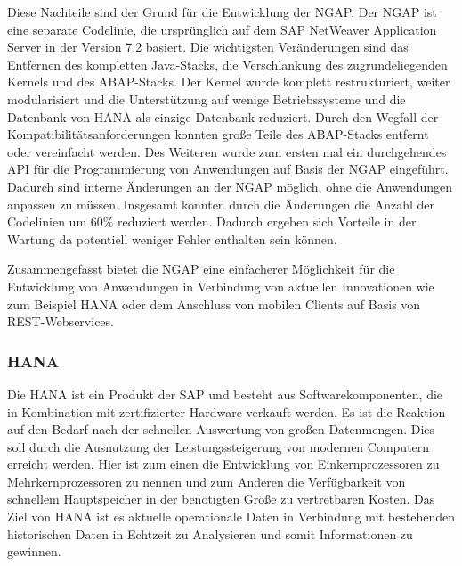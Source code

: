 Diese Nachteile sind der Grund für die Entwicklung der \gls{NGAP}. Der \gls{NGAP} ist eine separate Codelinie, die ursprünglich auf dem SAP NetWeaver Application Server in der Version 7.2 basiert. Die wichtigsten Veränderungen sind das Entfernen des kompletten Java-Stacks, die Verschlankung des zugrundeliegenden Kernels und des ABAP-Stacks. Der Kernel wurde komplett restrukturiert, weiter modularisiert und die Unterstützung auf wenige Betriebssysteme und die Datenbank von \gls{HANA} als einzige Datenbank reduziert. Durch den Wegfall der Kompatibilitätsanforderungen konnten große Teile des ABAP-Stacks entfernt oder vereinfacht werden. Des Weiteren wurde zum ersten mal ein durchgehendes API für die Programmierung von Anwendungen auf Basis der \gls{NGAP} eingeführt. Dadurch sind interne Änderungen an der \gls{NGAP} möglich, ohne die Anwendungen anpassen zu müssen. Insgesamt konnten durch die Änderungen die Anzahl der Codelinien um 60\% reduziert werden. Dadurch ergeben sich Vorteile in der Wartung da potentiell weniger Fehler enthalten sein können.

Zusammengefasst bietet die \gls{NGAP} eine einfacherer Möglichkeit für die Entwicklung von Anwendungen in Verbindung von aktuellen Innovationen wie zum Beispiel \gls{HANA} oder dem Anschluss von mobilen Clients auf Basis von REST-Webservices.

\subsubsection{HANA} %
Die \gls{HANA} ist ein Produkt der SAP und besteht aus Softwarekomponenten, die in Kombination mit zertifizierter Hardware verkauft werden. Es ist die Reaktion auf den Bedarf nach der schnellen Auswertung von großen Datenmengen. Dies soll durch die Ausnutzung der Leistungssteigerung von modernen Computern erreicht werden. Hier ist zum einen die Entwicklung von Einkernprozessoren zu Mehrkernprozessoren zu nennen und zum Anderen die Verfügbarkeit von schnellem Hauptspeicher in der benötigten Größe zu vertretbaren Kosten. Das Ziel von \gls{HANA} ist es aktuelle operationale Daten in Verbindung mit bestehenden historischen Daten in Echtzeit zu Analysieren und somit Informationen zu gewinnen.

